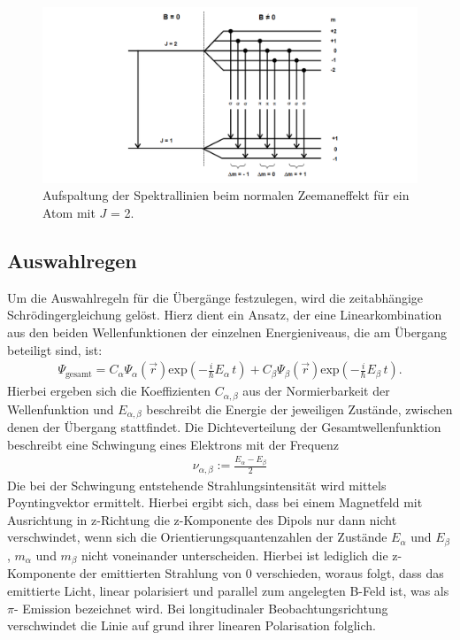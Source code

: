 \FloatBarrier
\begin{figure}
  \centering
  \includegraphics[scale=0.4]{normaler.PNG}
  \caption{Aufspaltung der Spektrallinien beim normalen Zeemaneffekt für ein Atom mit $J$ = 2. \cite{Q1}}
  \label{abb1}
\end{figure}
\FloatBarrier

\subsection{Auswahlregen}
Um die Auswahlregeln für die Übergänge festzulegen, wird die zeitabhängige Schrödingergleichung gelöst.
Hierz dient ein Ansatz, der eine Linearkombination aus den beiden Wellenfunktionen
der einzelnen Energieniveaus, die am Übergang beteiligt sind, ist:
\begin{align*}
    \Psi_{\text{gesamt}} = C_{\alpha} \Psi_{\alpha}(\vec{r}) \text{exp}\left( -\frac{i}{\hbar}E_{\alpha} \, t \right) + C_{\beta} \Psi_{\beta}(\vec{r}) \text{exp}\left( -\frac{i}{\hbar}E_{\beta} \, t \right).
\end{align*}
Hierbei ergeben sich die Koeffizienten $C_{\alpha, \beta}$ aus der Normierbarkeit der
Wellenfunktion und $E_{\alpha, \beta}$ beschreibt die Energie der jeweiligen Zustände,
zwischen denen der Übergang stattfindet.
Die Dichteverteilung der Gesamtwellenfunktion beschreibt eine Schwingung eines Elektrons
mit der Frequenz
\FloatBarrier
\begin{align*}
    \nu_{\alpha, \beta} := \frac{E_{\alpha}-E_{\beta}}{2}
\end{align*}
Die bei der Schwingung entstehende Strahlungsintensität wird mittels Poyntingvektor
ermittelt. Hierbei ergibt sich, dass bei einem Magnetfeld mit Ausrichtung in z-Richtung
die z-Komponente des Dipols nur dann nicht verschwindet, wenn sich die Orientierungsquantenzahlen
der Zustände $E_{\alpha}$ und $E_{\beta}$, $m_{\alpha}$ und $m_{\beta}$ nicht
voneinander unterscheiden. Hierbei ist lediglich die z- Komponente der emittierten Strahlung von 0
verschieden, woraus folgt, dass das emittierte Licht, linear polarisiert und parallel zum
angelegten B-Feld ist, was als $\pi$- Emission bezeichnet wird. Bei longitudinaler Beobachtungsrichtung
verschwindet die Linie auf grund ihrer linearen Polarisation folglich.

